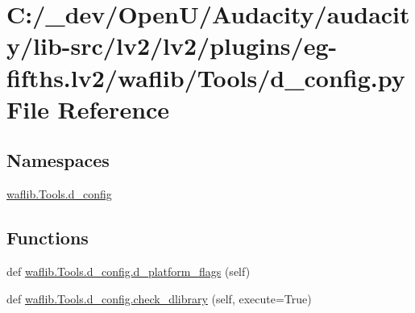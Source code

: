 \hypertarget{lv2_2plugins_2eg-fifths_8lv2_2waflib_2_tools_2d__config_8py}{}\section{C\+:/\+\_\+dev/\+Open\+U/\+Audacity/audacity/lib-\/src/lv2/lv2/plugins/eg-\/fifths.lv2/waflib/\+Tools/d\+\_\+config.py File Reference}
\label{lv2_2plugins_2eg-fifths_8lv2_2waflib_2_tools_2d__config_8py}
\subsection*{Namespaces}
\begin{DoxyCompactItemize}
\item 
 \hyperlink{namespacewaflib_1_1_tools_1_1d__config}{waflib.\+Tools.\+d\+\_\+config}
\end{DoxyCompactItemize}
\subsection*{Functions}
\begin{DoxyCompactItemize}
\item 
def \hyperlink{namespacewaflib_1_1_tools_1_1d__config_a430d331781f08b8478d542b708c4ccf4}{waflib.\+Tools.\+d\+\_\+config.\+d\+\_\+platform\+\_\+flags} (self)
\item 
def \hyperlink{namespacewaflib_1_1_tools_1_1d__config_ae2009fc7aeda344482ce8fc8eae64f49}{waflib.\+Tools.\+d\+\_\+config.\+check\+\_\+dlibrary} (self, execute=True)
\end{DoxyCompactItemize}
